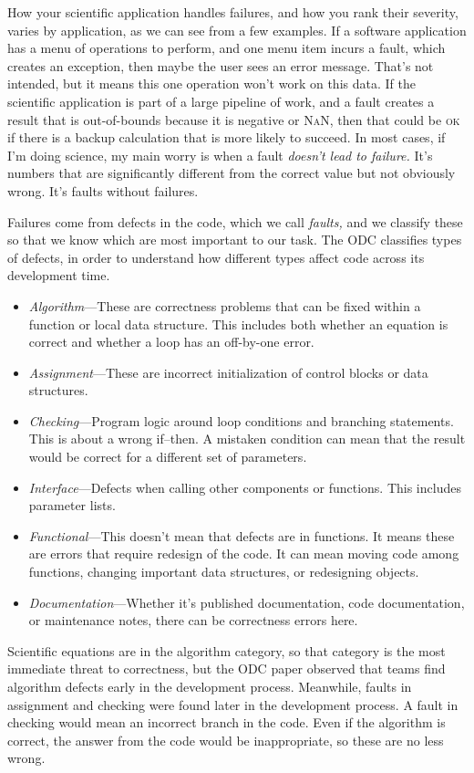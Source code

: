 \documentclass[fleqn,10pt]{olplainarticle}
\begin{document}
How your scientific application handles failures, and how you
rank their severity, varies by application, as we can see from
a few examples. If a software application has a menu of operations
to perform, and one menu item incurs a fault, which creates an exception,
then maybe the user sees an error message. That's not intended, but
it means this one operation won't work on this data.
If the scientific application is part of a large pipeline of
work, and a fault creates a result that is out-of-bounds because
it is negative or \textsc{NaN}, then that could be \textsc{ok}
if there is a backup calculation that is more likely to succeed.
In most cases, if I'm doing science, my main worry is when a
fault \emph{doesn't lead to failure.} It's numbers that are
significantly different from the correct value but not obviously
wrong. It's faults without failures.

Failures come from defects in the code, which we call \emph{faults,}
and we classify these so that we know which are most important
to our task. The ODC classifies types of defects, in order to understand
how different types affect code across its development time.
\begin{itemize}
    \item \emph{Algorithm}---These are correctness problems
    that can be fixed within a function or local data structure.
    This includes both whether an equation is correct and whether
    a loop has an off-by-one error.

    \item \emph{Assignment}---These are incorrect initialization
    of control blocks or data structures.

    \item \emph{Checking}---Program logic around loop conditions
    and branching statements. This is about a wrong if--then. A mistaken condition can mean that
    the result would be correct for a different set of parameters.

    \item \emph{Interface}---Defects when calling other components
    or functions. This includes parameter lists.

    \item \emph{Functional}---This doesn't mean that defects are
    in functions. It means these are errors that require redesign
    of the code. It can mean moving code among functions, changing
    important data structures, or redesigning objects.

    \item \emph{Documentation}---Whether it's published documentation,
    code documentation, or maintenance notes, there can be
    correctness errors here.
\end{itemize}
Scientific equations are in the algorithm category, so that category
is the most immediate threat to correctness, but the
ODC paper observed that teams find algorithm defects early in the
development process. Meanwhile, faults in assignment and checking were
found later in the development process. A fault in checking would
mean an incorrect branch in the code. Even if the algorithm is
correct, the answer from the code would be inappropriate, so these
are no less wrong.
\end{document}
